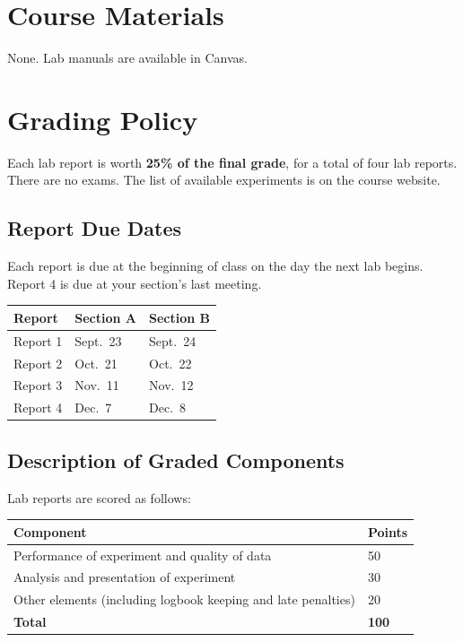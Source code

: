 \documentclass[11pt]{article}
\begin{document}
\section*{Course Materials}

None. Lab manuals are available in Canvas.

\section*{Grading Policy}

Each lab report is worth \textbf{25\% of the final grade}, for a total of four lab reports. There are no exams. The list of available experiments is on the course website.

\subsection*{Report Due Dates}

Each report is due at the beginning of class on the day the next lab begins. Report 4 is due at your section's last meeting.

\begin{center}
\renewcommand{\arraystretch}{1.15}
\begin{tabularx}{0.98\textwidth}{X p{} p{}}
\toprule
\textbf{Report} & \textbf{Section A} & \textbf{Section B} \\
\midrule
Report 1 & Sept.~23 & Sept.~24 \\
Report 2 & Oct.~21 & Oct.~22 \\
Report 3 & Nov.~11 & Nov.~12 \\
Report 4 & Dec.~7 & Dec.~8 \\
\bottomrule
\end{tabularx}
\renewcommand{\arraystretch}{1.0}
\end{center}

\subsection*{Description of Graded Components}

Lab reports are scored as follows:

\begin{center}
\renewcommand{\arraystretch}{1.15}
\begin{tabularx}{0.98\textwidth}{X p{}}
\toprule
\textbf{Component} & \textbf{Points} \\
\midrule
Performance of experiment and quality of data & 50 \\
Analysis and presentation of experiment & 30 \\
Other elements (including logbook keeping and late penalties) & 20 \\
\midrule
\textbf{Total} & \textbf{100} \\
\bottomrule
\end{tabularx}
\renewcommand{\arraystretch}{1.0}
\end{center}
\end{document}
